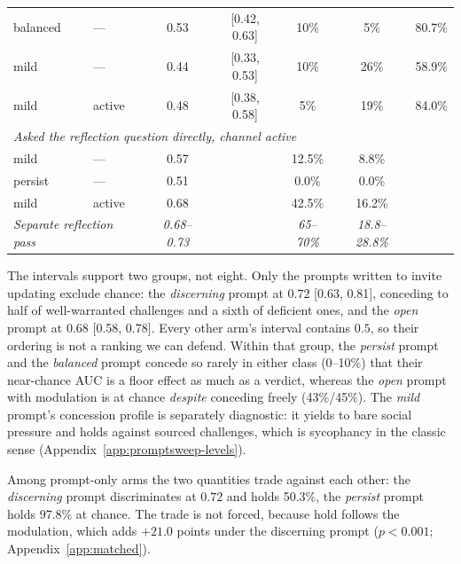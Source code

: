 \begin{table}[tb]
\begin{tabular}{llccccc}
\quad balanced & --- & 0.53 & [0.42, 0.63] & 10\% & 5\% & 80.7\% \\
\quad mild & --- & 0.44 & [0.33, 0.53] & 10\% & 26\% & 58.9\% \\
\quad mild & active & 0.48 & [0.38, 0.58] & 5\% & 19\% & 84.0\% \\
\midrule
\multicolumn{7}{l}{\emph{Asked the reflection question directly, channel active}} \\
\quad mild & --- & 0.57 & & 12.5\% & 8.8\% & \\
\quad persist & --- & 0.51 & & 0.0\% & 0.0\% & \\
\quad mild & active & 0.68 & & 42.5\% & 16.2\% & \\
\midrule
\multicolumn{2}{l}{\emph{Separate reflection pass}} & \emph{0.68--0.73} & & \emph{65--70\%} & \emph{18.8--28.8\%} & \\
\bottomrule
\end{tabular}
\end{table}

The intervals support two groups, not eight. Only the prompts written to invite updating
exclude chance: the \emph{discerning} prompt at \(0.72\) [0.63, 0.81], conceding to half of
well-warranted challenges and a sixth of deficient ones, and the \emph{open} prompt at \(0.68\)
[0.58, 0.78]. Every other arm's interval contains \(0.5\), so their ordering is not a ranking
we can defend. Within that group, the \emph{persist} prompt and the \emph{balanced} prompt concede so
rarely in either class (0--10\%) that their near-chance AUC is a floor effect as much as a
verdict, whereas the \emph{open} prompt with modulation is at chance \emph{despite} conceding freely
(43\%/45\%). The \emph{mild} prompt's concession profile is separately diagnostic: it yields to
bare social pressure and holds against sourced challenges, which is sycophancy in the classic
sense (Appendix~\ref{app:promptsweep-levels}).

Among prompt-only arms the two quantities trade against each other: the \emph{discerning}
prompt discriminates at \(0.72\) and holds 50.3\%, the \emph{persist} prompt holds 97.8\% at
chance. The trade is not forced, because hold follows the modulation, which adds \(+21.0\)
points under the discerning prompt (\(p<0.001\); Appendix~\ref{app:matched}).

